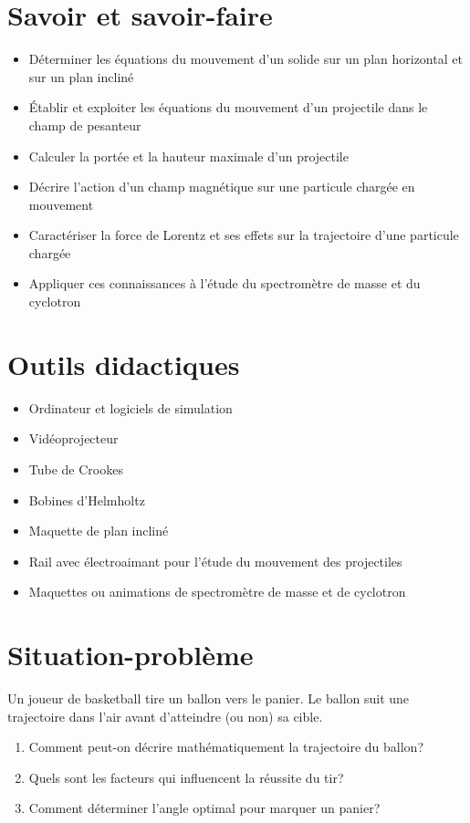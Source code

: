\documentclass[12pt]{article}
\begin{document}
\section*{Savoir et savoir-faire}
\begin{itemize}
    \item Déterminer les équations du mouvement d'un solide sur un plan horizontal et sur un plan incliné
    \item Établir et exploiter les équations du mouvement d'un projectile dans le champ de pesanteur
    \item Calculer la portée et la hauteur maximale d'un projectile
    \item Décrire l'action d'un champ magnétique sur une particule chargée en mouvement
    \item Caractériser la force de Lorentz et ses effets sur la trajectoire d'une particule chargée
    \item Appliquer ces connaissances à l'étude du spectromètre de masse et du cyclotron
\end{itemize}

\section*{Outils didactiques}
\begin{itemize}
    \item Ordinateur et logiciels de simulation
    \item Vidéoprojecteur
    \item Tube de Crookes
    \item Bobines d'Helmholtz
    \item Maquette de plan incliné
    \item Rail avec électroaimant pour l'étude du mouvement des projectiles
    \item Maquettes ou animations de spectromètre de masse et de cyclotron
\end{itemize}

\section*{Situation-problème}
Un joueur de basketball tire un ballon vers le panier. Le ballon suit une trajectoire dans l'air avant d'atteindre (ou non) sa cible.
\begin{enumerate}
    \item Comment peut-on décrire mathématiquement la trajectoire du ballon?
    \item Quels sont les facteurs qui influencent la réussite du tir?
    \item Comment déterminer l'angle optimal pour marquer un panier?
\end{enumerate}
\end{document}
